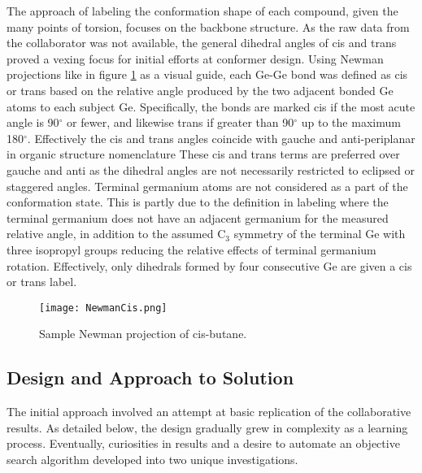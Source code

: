 The approach of labeling the conformation shape of each compound, given the many points of torsion, focuses on the backbone structure. 
As the raw data from the collaborator was not available, the general dihedral angles of cis and trans proved a vexing focus for initial efforts at conformer design.
Using Newman projections like in figure \ref{fig:Newman} as a visual guide, each Ge-Ge bond was defined as cis or trans based on the relative angle produced by the two adjacent bonded Ge atoms to each subject Ge.
Specifically, the bonds are marked cis if the most acute angle is 90$^{\circ}$ or fewer, and likewise trans if greater than 90$^{\circ}$ up to the maximum 180$^{\circ}$.
Effectively the cis and trans angles coincide with gauche and anti-periplanar in organic structure nomenclature %
These cis and trans terms are preferred over gauche and anti as the dihedral angles are not necessarily restricted to eclipsed or staggered angles.
Terminal germanium atoms are not considered as a part of the conformation state. 
This is partly due to the definition in labeling where the terminal germanium does not have an adjacent germanium for the measured relative angle, in addition to the assumed 
C$_{3}$
symmetry of the terminal Ge with three isopropyl groups reducing the relative effects of terminal germanium rotation.
Effectively, only dihedrals formed by four consecutive Ge are given a cis or trans label.

\begin{figure}
	
	\centering
	
	\texttt{[image: NewmanCis.png]}
	
	\caption{Sample Newman projection of cis-butane.}
	
	\label{fig:Newman}
	
\end{figure}

\subsection{Design and Approach to Solution}

The initial approach involved an attempt at basic replication of the collaborative results.
As detailed below, the design gradually grew in complexity as a learning process. 
Eventually, curiosities in results and a desire to automate an objective search algorithm developed into two unique investigations.


